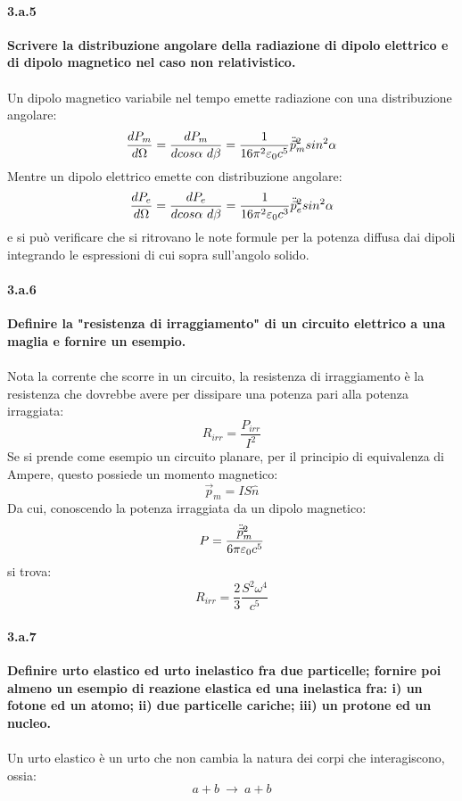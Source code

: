 \documentclass[twoside]{article}
\begin{document}
\paragraph{3.a.5}\textbf{Scrivere la distribuzione angolare della radiazione di dipolo elettrico e di dipolo
magnetico nel caso non relativistico.}\\ \\
Un dipolo magnetico variabile nel tempo emette radiazione con una distribuzione angolare:
\begin{equation}
    \frac{dP_m}{d\Omega}=\frac{dP_m}{dcos\alpha \ d\beta}=\frac{1}{16 \pi^2 \varepsilon_0 c^5}\Ddot{\vec{p}}_m^2 sin^2 \alpha
\end{equation}
Mentre un dipolo elettrico emette con distribuzione angolare:
\begin{equation}
    \frac{dP_e}{d\Omega}=\frac{dP_e}{dcos\alpha \ d\beta}=\frac{1}{16 \pi^2 \varepsilon_0 c^3}\Ddot{\vec{p}}_e^2 sin^2 \alpha
\end{equation}
e si può verificare che si ritrovano le note formule per la potenza diffusa dai dipoli integrando le espressioni di cui sopra sull'angolo solido.

\paragraph{3.a.6}\textbf{Definire la "resistenza di irraggiamento" di un circuito elettrico a una maglia e
fornire un esempio.}\\ \\
Nota la corrente che scorre in un circuito, la resistenza di irraggiamento è la resistenza che dovrebbe avere per dissipare una potenza pari alla potenza irraggiata:
\begin{equation}
    R_{irr}=\frac{P_{irr}}{I^2}
\end{equation}
Se si prende come esempio un circuito planare, per il principio di equivalenza di Ampere, questo possiede un momento magnetico:
\begin{equation}
    \vec{p}_m=IS\hat{n}
\end{equation}
Da cui, conoscendo la potenza irraggiata da un dipolo magnetico:
\begin{equation}
    P=\frac{\Ddot{\vec{p}}_m^2}{6\pi \varepsilon_0 c^5}
\end{equation}
si trova:
\begin{equation}
    R_{irr}=\frac{2}{3}\frac{S^2\omega^4}{c^5}
\end{equation}
\paragraph{3.a.7}\textbf{Definire urto elastico ed urto inelastico fra due particelle; fornire poi almeno un esempio di reazione elastica ed una inelastica fra: i) un fotone ed un atomo; ii) due particelle cariche; iii) un protone ed un nucleo.
}\\ \\
Un urto elastico è un urto che non cambia la natura dei corpi che interagiscono, ossia:
\begin{equation}
    a+b \ \rightarrow \ a+b
\end{equation}
\end{document}

